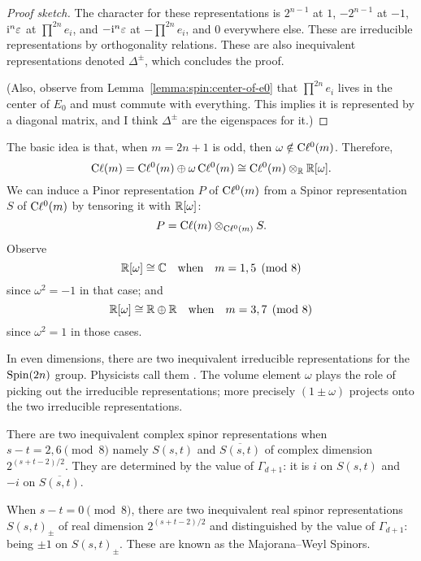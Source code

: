 \begin{proof}[Proof sketch]
The character for these representations is $2^{n-1}$ at $1$, $-2^{n-1}$
at $-1$, $\mathrm{i}^{n}\varepsilon$ at $\prod^{2n}e_{i}$, and $-\mathrm{i}^{n}\varepsilon$
at $-\prod^{2n}e_{i}$, and $0$ everywhere else. These are irreducible
representations by orthogonality relations. These are also inequivalent
representations denoted $\Delta^{\pm}$, which concludes the proof.

(Also, observe from Lemma~\ref{lemma:spin:center-of-e0} that
$\prod^{2n}e_{i}$ lives in the center of $E_{0}$ and must commute with
everything. This implies it is represented by a diagonal matrix, and I
think $\Delta^{\pm}$ are the eigenspaces for it.)
\end{proof}

\M
The basic idea is that, when $m=2n+1$ is odd, then
$\omega\notin\mathrm{C}\ell^{0}(m)$. Therefore,
\begin{equation}
\mathrm{C}\ell(m) = \mathrm{C}\ell^{0}(m) \oplus \omega\,\mathrm{C}\ell^{0}(m)\cong\mathrm{C}\ell^{0}(m)\otimes_{\mathbb{R}}\mathbb{R}[\omega].
\end{equation}
We can induce a Pinor representation $P$ of $\mathrm{C}\ell^{0}(m)$ from a Spinor
representation $S$ of $\mathrm{C}\ell^{0}(m)$ by tensoring it
with $\mathbb{R}[\omega]$:
\begin{equation}
P = \mathrm{C}\ell(m)\otimes_{\mathrm{C}\ell^{0}(m)} S.
\end{equation}
Observe
\begin{equation}
\mathbb{R}[\omega]\cong\mathbb{C}\quad\mbox{when}\quad m=1,5\pmod8
\end{equation}
since $\omega^{2}=-1$ in that case; and
\begin{equation}
\mathbb{R}[\omega]\cong\mathbb{R}\oplus\mathbb{R}\quad\mbox{when}\quad m=3,7\pmod8
\end{equation}
since $\omega^{2}=1$ in those cases.

In even dimensions, there are two inequivalent irreducible
representations for the $\operatorname{Spin}(2n)$ group. Physicists call them
. The volume element $\omega$ plays the role of
picking out the irreducible representations; more precisely
$(1\pm\omega)$ projects onto the two irreducible representations.

\M
There are two inequivalent complex spinor representations when $s-t=2,6\pmod8$
namely $S(s,t)$ and $\overline{S(s,t)}$ of complex dimension
$2^{(s+t-2)/2}$. They are determined by the value of $\Gamma_{d+1}$: it is
$i$ on $S(s,t)$ and $-i$ on $\overline{S(s,t)}$.

When $s-t=0\pmod8$, there are two inequivalent real spinor
representations $S(s,t)_{\pm}$ of real dimension $2^{(s+t-2)/2}$ and
distinguished by the value of $\Gamma_{d+1}$: being $\pm1$ on $S(s,t)_{\pm}$.
These are known as the Majorana--Weyl Spinors.

